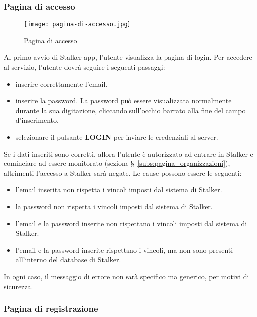 \documentclass[../manuale-utente.tex]{subfiles}
\begin{document}
\subsubsection{Pagina di accesso}%
\label{sub:pagina_di_accesso}

\begin{figure}[H]
    \centering
    \texttt{[image: pagina-di-accesso.jpg]}
    \caption{Pagina di accesso}%
    \label{fig:mobile_app_pagina_di_accesso}
\end{figure}
Al primo avvio di Stalker app, l'utente visualizza la pagina di login.
Per accedere al servizio, l'utente dovrà seguire i seguenti passaggi:
\begin{itemize}
    \item inserire correttamente l'email.
    \item inserire la password. La password può essere visualizzata normalmente durante la sua digitazione, cliccando sull'occhio barrato alla fine del campo d'inserimento.
    \item selezionare il pulsante \textbf{LOGIN} per inviare le credenziali al server.
\end{itemize}
Se i dati inseriti sono corretti, allora l'utente è autorizzato ad entrare in Stalker e cominciare ad essere monitorato (sezione §~\ref{subs:pagina_organizzazioni}), altrimenti l'accesso a Stalker sarà negato.
Le cause possono essere le seguenti:
\begin{itemize}
    \item l'email inserita non rispetta i vincoli imposti dal sistema di Stalker.
    \item la password non rispetta i vincoli imposti dal sistema di Stalker.
    \item l'email e la password inserite non rispettano i vincoli imposti dal sistema di Stalker.
    \item l'email e la password inserite rispettano i vincoli, ma non sono presenti all'interno del database di Stalker.
\end{itemize}
In ogni caso, il messaggio di errore non sarà specifico ma generico, per motivi di sicurezza.

\subsubsection{Pagina di registrazione}%
\label{subs:pagina_di_registrazione}
\end{document}
